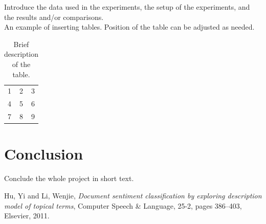 \documentclass[11pt]{article}
\begin{document}
Introduce the data used in the experiments, the setup of the experiments, and the results and/or comparisons. \\

An example of inserting tables. Position of the table can be adjusted as needed.
\begin{table}[!htp] 
  \centering
    \begin{tabular}{| l c r |}   %
    \hline
    1 & 2 & 3 \\
    4 & 5 & 6 \\ \hline
    7 & 8 & 9 \\
    \hline
    \end{tabular}
  \caption{Brief description of the table.}
\end{table}

\section{Conclusion}
Conclude the whole project in short text.


\begin{thebibliography}{9}

  Hu, Yi and Li, Wenjie,
  \textit{Document sentiment classification by exploring description model of topical terms},
  Computer Speech \& Language,
  25-2, pages 386--403,
  Elsevier, 2011.

\end{thebibliography}
 
\end{document}

